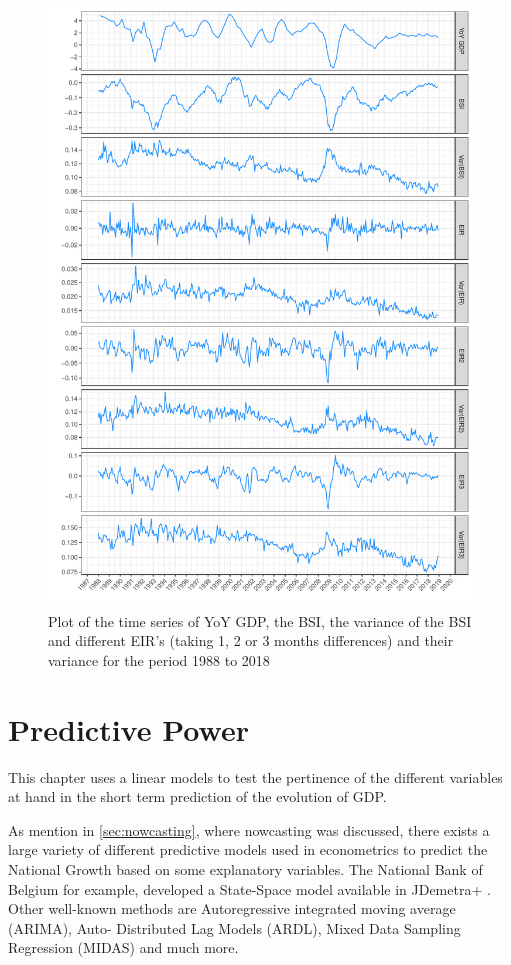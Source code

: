 \documentclass[12pt,a4paper,oneside]{book}
\begin{document}
\begin{figure}[!htbp]
    \centering
    \includegraphics[scale=0.7]{Graphs/variables.pdf}
    \caption{Plot of the time series of YoY GDP, the BSI, the variance of the BSI and different EIR's (taking 1, 2 or 3 months differences) and their variance
    for the period 1988 to 2018}
    \label{plot:variables}
\end{figure}



\chapter{Predictive Power}

This chapter uses a linear models to test the pertinence of the different variables at hand in the short term prediction of the evolution of GDP.

As mention in \autoref{sec:nowcasting}, where nowcasting was discussed, there exists a large variety of different predictive models used in econometrics to predict the National Growth based on some explanatory variables.
The National Bank of Belgium for example, developed a State-Space model available in JDemetra+ \citep{de_antonio_liedo_nowcasting_2014}. 
Other well-known methods are Autoregressive integrated moving average (ARIMA), Auto- Distributed Lag Models (ARDL), Mixed Data Sampling Regression (MIDAS) and much more.
\end{document}
